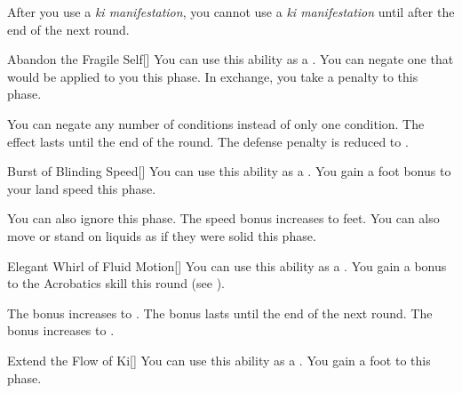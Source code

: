         After you use a \textit{ki manifestation}, you cannot use a \textit{ki manifestation} until after the end of the next round.
        {
            \begin{freeability}{Abandon the Fragile Self}[]
                You can use this ability as a .
                You can negate one  that would be applied to you this phase.
                In exchange, you take a  penalty to  this phase.

                \rankline
                 You can negate any number of conditions instead of only one condition.
                 The effect lasts until the end of the round.
                 The defense penalty is reduced to .
            \end{freeability}

            \begin{freeability}{Burst of Blinding Speed}[]
                You can use this ability as a .
                You gain a  foot bonus to your land speed this phase.

                \rankline
                 You can also ignore  this phase.
                 The speed bonus increases to  feet.
                 You can also move or stand on liquids as if they were solid this phase.
            \end{freeability}

            \begin{freeability}{Elegant Whirl of Fluid Motion}[]
                You can use this ability as a .
                You gain a  bonus to the Acrobatics skill this round (see ).

                \rankline
                 The bonus increases to .
                 The bonus lasts until the end of the next round.
                 The bonus increases to .
            \end{freeability}

            \begin{freeability}{Extend the Flow of Ki}[]
                You can use this ability as a .
                You gain a  foot  to  this phase.


\end{freeability}}
